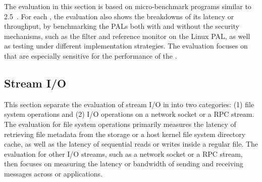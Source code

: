 The evaluation in this section is based on micro-benchmark programs similar to \lmbench{} 2.5~\cite{McVoy:lmbench}.
For each \hostapis{}, the evaluation also shows the breakdowns
of its latency or throughput,
by benchmarking the PALs both with and without the security mechanisms, such as the \seccomp{} filter and reference monitor on the Linux PAL,
as well as testing under different
implementation strategies.
The evaluation focuses on \hostapis{} that are especially sensitive for the performance of the \graphene{} \libos{}.





\subsection{Stream I/O}

This section separate the evaluation of stream I/O in \thehostabi{} into 
two categories:
(1) file system operations and (2) I/O operations on a network socket or a RPC stream.
The evaluation for file system operations
primarily measures
the latency of retrieving file metadata from the storage or a host kernel file system directory cache,
as well as the latency of sequential reads or writes
inside a regular file.
The evaluation for other I/O streams, such as a network socket or a RPC stream,
then focuses on measuring the latency or bandwidth
of sending and receiving messages 
across \picoprocs{} or applications.







